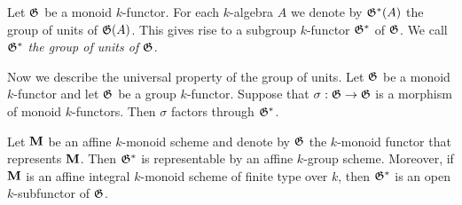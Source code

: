 \begin{definition}
Let ${\mathfrak G}$ be a monoid $k$-functor. For each $k$-algebra $A$ we denote by ${\mathfrak G}^*(A)$ the group of units of ${\mathfrak G}(A)$. This gives rise to a subgroup $k$-functor ${\mathfrak G}^*$ of ${\mathfrak G}$. We call ${\mathfrak G}^*$ \textit{the group of units of ${\mathfrak G}$}.
\end{definition}
\noindent
Now we describe the universal property of the group of units. Let ${\mathfrak G}$ be a monoid $k$-functor and let ${\mathfrak G}$ be a group $k$-functor. Suppose that $\sigma:{\mathfrak G}\rightarrow {\mathfrak G}$ is a morphism of monoid $k$-functors. Then $\sigma$ factors through ${\mathfrak G}^*$.

\begin{proposition}\label{proposition:integral_monoids_groups_of_units_are_schematically_dense}
Let $\mathbf{M}$ be an affine $k$-monoid scheme and denote by ${\mathfrak G}$ the $k$-monoid functor that represents $\mathbf{M}$. Then ${\mathfrak G}^*$ is representable by an affine $k$-group scheme. Moreover, if $\mathbf{M}$ is an affine integral $k$-monoid scheme of finite type over $k$, then ${\mathfrak G}^*$ is an open $k$-subfunctor of ${\mathfrak G}$.
\end{proposition}











\small




